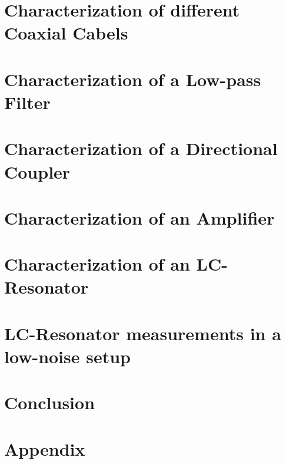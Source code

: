 \documentclass[a4paper,10pt]{scrreprt}
\begin{document}
    \newpage
    
    \chapter{Characterization of different Coaxial Cabels}
    \newpage
    
    \chapter{Characterization of a Low-pass Filter}
    \newpage
    
    \chapter{Characterization of a Directional Coupler}
    \newpage
    
    \chapter{Characterization of an Amplifier}
    \newpage
    
    \chapter{Characterization of an LC-Resonator}
    \newpage
    
    \chapter{LC-Resonator measurements in a low-noise setup}
    \newpage
    
    \chapter{Conclusion}
    \newpage
    
    \chapter{Appendix}
    
\backmatter  

\end{document}
